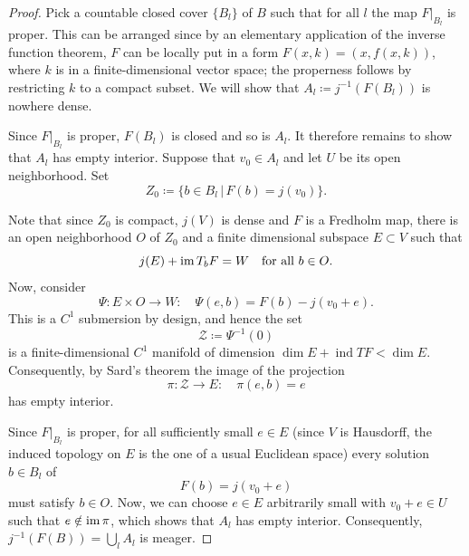 \documentclass[11pt,a4paper]{article}
\theoremstyle{definition}
\newcommand{\im}{\textnormal{im\,}}
\DeclareMathOperator{\ind}{ind}
\newcommand{\cZ}{\mathcal{Z}}
\begin{document}
\begin{proof}
  Pick a countable closed cover $\{ B_l \}$ of $B$ such that for all $l$ the map $F|_{B_l}$ is proper. This can be arranged since by an elementary application of the inverse function theorem, $F$ can be locally put in a form $F(x, k) = (x, f(x, k))$, where $k$ is in a finite-dimensional vector space; the properness follows by restricting $k$ to a compact subset. We will show that $A_l \coloneq j^{-1}(F(B_l))$ is nowhere dense. 

  Since $F|_{B_l}$ is proper, $F(B_l)$ is closed and so is $A_l$. It therefore remains to show that $A_l$ has empty interior. Suppose that $v_0 \in A_l$ and let $U$ be its open neighborhood. Set
  \begin{equation*}
    Z_0 \coloneq \{b \in B_l \, | \, F(b)=j(v_0) \}.
  \end{equation*}

  Note that since $Z_0$ is compact, $j(V)$ is dense and $F$ is a Fredholm map, there is an open neighborhood $O$ of $Z_0$ and a finite dimensional subspace $E \subset V$ such that 
  \begin{equation*}
    j(E) + \im T_b F = W \quad \text{for all } b \in O.
  \end{equation*}
  Now, consider
  \begin{equation*}
    \Psi: E \times O \to W: \quad \Psi(e, b) = F(b) - j(v_0+e).
  \end{equation*}
  This is a $C^1$ submersion by design, and hence the set 
  \begin{equation*}
    \cZ \coloneq \Psi^{-1}(0)
  \end{equation*}
  is a finite-dimensional $C^1$ manifold of dimension $\dim E + \ind TF < \dim E$. Consequently, by Sard's theorem the image of the projection 
  \begin{equation*}
    \pi: \cZ \to E: \quad \pi(e, b) = e
  \end{equation*}
  has empty interior. 

  Since $F|_{B_l}$ is proper, for all sufficiently small $e \in E$ (since $V$ is Hausdorff, the induced topology on $E$ is the one of a usual Euclidean space) every solution $b \in B_l$ of
  \begin{equation*}
    F(b) = j(v_0 +e)
  \end{equation*}
  must satisfy $b \in O$. Now, we can choose $e \in E$ arbitrarily small with $v_0 + e \in U$ such that $e \notin \im \pi$, which shows that $A_l$ has empty interior. Consequently, $j^{-1}(F(B)) = \bigcup_l A_l$ is meager.
\end{proof}
\end{document}
